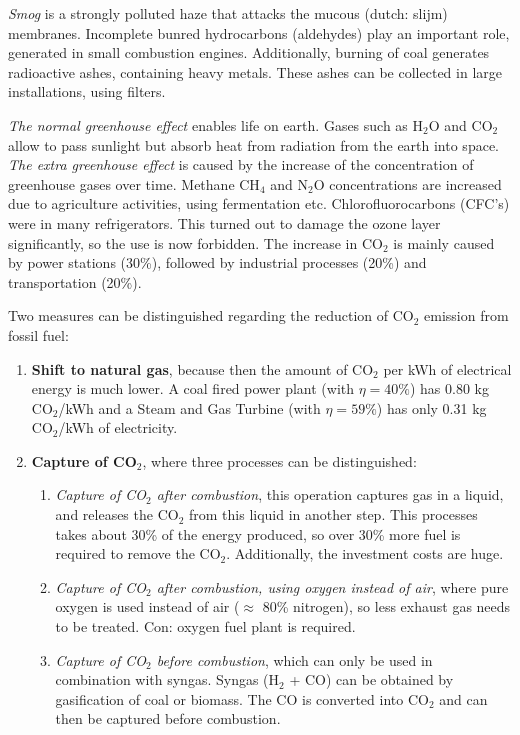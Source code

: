 \documentclass[a4paper,10pt]{article}
\begin{document}
\emph{Smog} is a strongly polluted haze that attacks the mucous (dutch: slijm) membranes. Incomplete bunred hydrocarbons (aldehydes) play an important role, generated in small combustion engines. Additionally, burning of coal generates radioactive ashes, containing heavy metals. These ashes can be collected in large installations, using filters. 

\emph{The normal greenhouse effect} enables life on earth. Gases such as H$_2$O and CO$_2$ allow to pass sunlight but absorb heat from radiation from the earth into space. \\
\emph{The extra greenhouse effect} is caused by the increase of the concentration of greenhouse gases over time. Methane CH$_4$ and N$_2$O concentrations are increased due to agriculture activities, using fermentation etc. Chlorofluorocarbons (CFC's) were in many refrigerators. This turned out to damage the ozone layer significantly, so the use is now forbidden. The increase in CO$_2$ is mainly caused by power stations (30\%), followed by industrial processes (20\%) and transportation (20\%). \bigskip

Two measures can be distinguished regarding the reduction of CO$_2$ emission from fossil fuel:
\begin{enumerate}
 \item \textbf{Shift to natural gas}, because then the amount of CO$_2$ per kWh of electrical energy is much lower. A coal fired power plant (with $\eta = 40 \%$) has 0.80 kg CO$_2$/kWh and a Steam and Gas Turbine (with $\eta = 59 \%$) has only 0.31 kg CO$_2$/kWh of electricity.
 \item \textbf{Capture of CO$_2$}, where three processes can be distinguished:
 \begin{enumerate}
  \item \emph{Capture of CO$_2$ after combustion}, this operation captures gas in a liquid, and releases the CO$_2$ from this liquid in another step. This processes takes about 30\% of the energy produced, so over 30\% more fuel is required to remove the CO$_2$. Additionally, the investment costs are huge.
  \item \emph{Capture of CO$_2$ after combustion, using oxygen instead of air}, where pure oxygen is used instead of air ($\approx$ 80\% nitrogen), so less exhaust gas needs to be treated. Con: oxygen fuel plant is required.
  \item \emph{Capture of CO$_2$ before combustion}, which can only be used in combination with syngas. Syngas (H$_2$ + CO) can be obtained by gasification of coal or biomass. The CO is converted into CO$_2$ and can then be captured before combustion.
 \end{enumerate}
\end{enumerate}
\end{document}
